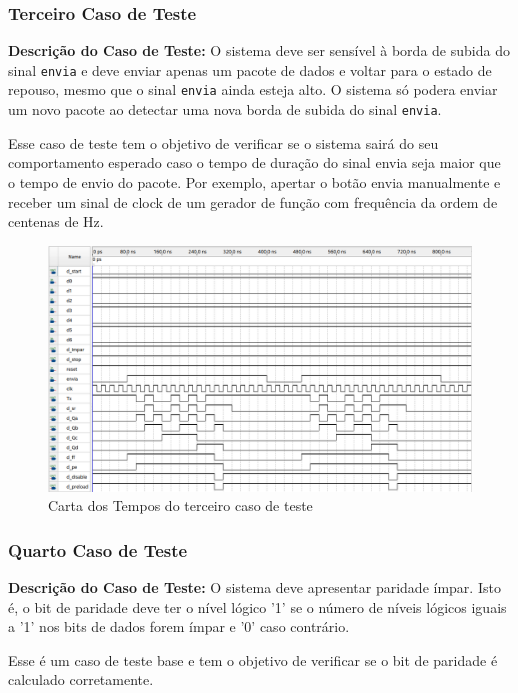 \documentclass[a4,12pt]{horizon-theme}
\begin{document}
\newpage
\subsubsection{Terceiro Caso de Teste}
\label{ap:tc-3}
{\bf Descrição do Caso de Teste:} O sistema deve ser sensível à borda de subida do sinal \texttt{envia} e deve enviar apenas um pacote de dados e voltar para o estado de repouso, mesmo que o sinal \texttt{envia} ainda esteja alto. O sistema só podera enviar um novo pacote ao detectar uma nova borda de subida do sinal \texttt{envia}.

Esse caso de teste tem o objetivo de verificar se o sistema sairá do seu comportamento esperado caso o tempo de duração do sinal envia seja maior que o tempo de envio do pacote. Por exemplo, apertar o botão envia manualmente e receber um sinal de clock de um gerador de função com frequência da ordem de centenas de Hz.

\begin{figure}[!ht]
    \centering
    \includegraphics[width=\textwidth]{tc-3.png}
    \caption{Carta dos Tempos do terceiro caso de teste}
    \label{fig:tc3}
\end{figure}

\newpage
\subsubsection{Quarto Caso de Teste}
\label{ap:tc-4}
{\bf Descrição do Caso de Teste:} O sistema deve apresentar paridade ímpar. Isto é, o bit de paridade deve ter o nível lógico '1' se o número de níveis lógicos iguais a '1' nos bits de dados forem ímpar e '0' caso contrário.

Esse é um caso de teste base e tem o objetivo de verificar se o bit de paridade é calculado corretamente.
\end{document}
